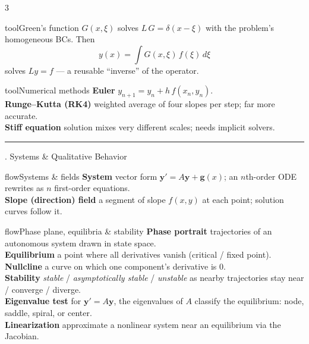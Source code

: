 \documentclass[10pt]{article}
\newcommand{\lab}[1]{\textcolor{ink}{\sffamily\footnotesize\textbf{#1}}\;}
\newcommand{\sect}[2]{%
  \begin{tcolorbox}[blanker, breakable, before skip=2pt, after skip=2pt]
    \begingroup\sffamily\bfseries\normalsize\color{#1}%
    {\color{#1}\rule[-1pt]{3pt}{12pt}}\;#2\endgroup
    \par\vspace{1pt}{\color{#1}\hrule height 1pt}
\end{tcolorbox}}
\begin{document}
\begin{multicols}{3}
  \begin{card}{tool}{Green's function}
    $G(x,\xi)$ solves $L\,G=\delta(x-\xi)$ with the problem's homogeneous BCs. Then
    \[
      y(x)=\int G(x,\xi)\,f(\xi)\,d\xi
    \]
    solves $Ly=f$ --- a reusable ``inverse'' of the operator.
  \end{card}

  \begin{card}{tool}{Numerical methods}
    \lab{Euler} $y_{n+1}=y_n+h\,f(x_n,y_n)$.\\
    \lab{Runge--Kutta (RK4)} weighted average of four slopes per step; far more accurate.\\
    \lab{Stiff equation} solution mixes very different scales; needs implicit solvers.
  \end{card}

  \sect{flow}{10.\; Systems \& Qualitative Behavior}

  \begin{card}{flow}{Systems \& fields}
    \lab{System} vector form $\mathbf{y}'=A\mathbf{y}+\mathbf{g}(x)$; an $n$th-order ODE rewrites as $n$ first-order equations.\\
    \lab{Slope (direction) field} a segment of slope $f(x,y)$ at each point; solution curves follow it.
  \end{card}

  \begin{card}{flow}{Phase plane, equilibria \& stability}
    \lab{Phase portrait} trajectories of an autonomous system drawn in state space.\\
    \lab{Equilibrium} a point where all derivatives vanish (critical / fixed point).\\
    \lab{Nullcline} a curve on which one component's derivative is $0$.\\
    \lab{Stability} \emph{stable} / \emph{asymptotically stable} / \emph{unstable} as nearby trajectories stay near / converge / diverge.\\
    \lab{Eigenvalue test} for $\mathbf{y}'=A\mathbf{y}$, the eigenvalues of $A$ classify the equilibrium: node, saddle, spiral, or center.\\
    \lab{Linearization} approximate a nonlinear system near an equilibrium via the Jacobian.
  \end{card}

\end{multicols}
\end{document}

